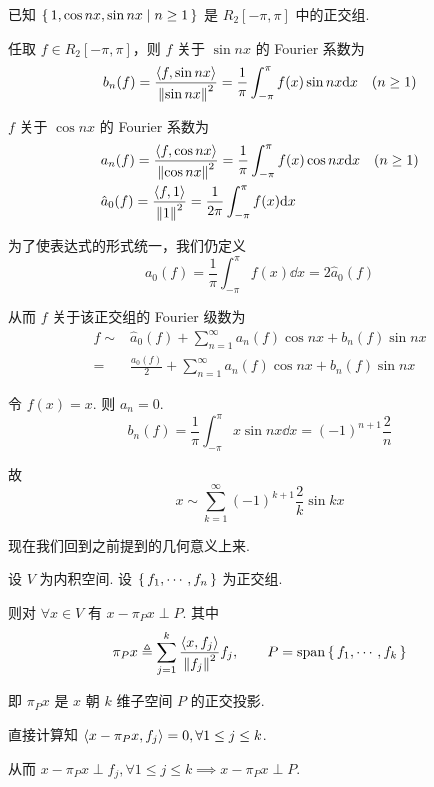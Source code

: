\begin{example}
    已知 $\set{1,\cos nx,\sin nx|n\ge 1}$ 是 $R_2[-\pi,\pi]$ 中的正交组.

    任取 $f\in R_2[-\pi,\pi]$，则 $f$ 关于 $\sin nx$ 的 Fourier 系数为
$$
b_n(f)=\frac{\left\langle{f,\sin nx}\right\rangle}{\left\lVert{\sin nx}\right\rVert^2}=\frac{1}{\pi}\int_{-\pi}^\pi f(x)\sin nx\mathrm{d} x\quad(n\ge 1)
$$

    $f$ 关于 $\cos nx$ 的 Fourier 系数为
$$
\begin{aligned}
    &a_n(f)=\frac{\left\langle{f,\cos nx}\right\rangle}{\left\lVert{\cos nx}\right\rVert^2}=\frac{1}{\pi}\int_{-\pi}^\pi f(x)\cos nx\mathrm{d} x\quad(n\ge 1)\\
    &\hat{a}_0(f)=\frac{\left\langle{f,1}\right\rangle}{\left\lVert{1}\right\rVert^2}=\frac{1}{2\pi}\int_{-\pi}^{\pi}f(x)\mathrm{d} x
\end{aligned}
$$

    为了使表达式的形式统一，我们仍定义
$$
a_0(f)=\frac{1}{\pi}\int_{-\pi}^{\pi}f(x)\dd x=2\hat{a}_0(f)
$$

    从而 $f$ 关于该正交组的 Fourier 级数为
$$
\begin{aligned}
    f\sim&\hat{a}_0(f)+\sum_{n=1}^\infty a_n(f)\cos nx+b_n(f)\sin nx\\
    =&\frac{a_0(f)}{2}+\sum_{n=1}^\infty a_n(f)\cos nx+b_n(f)\sin nx
\end{aligned}
$$
\end{example}

\begin{example}
    令 $f(x)=x$. 则 $a_n=0$.
$$
b_n(f)=\frac{1}{\pi}\int_{-\pi}^{\pi}x\sin nx\dd x=(-1)^{n+1}\frac{2}{n}
$$

    故
$$
x\sim\sum_{k=1}^\infty (-1)^{k+1}\frac{2}{k}\sin kx
$$
\end{example}


现在我们回到之前提到的几何意义上来.

\begin{property}
    设 $V$ 为内积空间. 设 $\set{f_1,\cdots,f_n}$ 为正交组.

    则对 $\forall x\in V$ 有 $x-\pi_Px\perp P$. 其中
$$
\pi_Px\triangleq\sum_{j=1}^k\frac{\left\langle{x,f_j}\right\rangle}{\left\lVert{f_j}\right\rVert^2}f_j,\qquad P=\mathrm{span}\set{f_1,\cdots,f_k}
$$

    即 $\pi_Px$ 是 $x$ 朝 $k$ 维子空间 $P$ 的正交投影.
\end{property}
\begin{property}
    直接计算知 $\left\langle{x-\pi_Px,f_j}\right\rangle=0,\forall 1\le j\le k$.

    从而 $x-\pi_Px\perp f_j,\forall 1\le j\le k\implies x-\pi_Px\perp P$.
\end{property}

